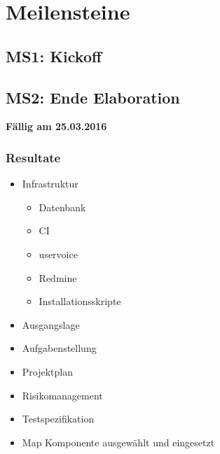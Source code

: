 \section{Meilensteine}
\subsection{MS1: Kickoff}

\subsection{MS2: Ende Elaboration}
\label{pm-ms2}
\textbf{Fällig am 25.03.2016}
\subsubsection{Resultate}
\begin{itemize}
	\item Infrastruktur
	\begin{itemize}
		\item Datenbank
		\item CI
		\item uservoice
		\item Redmine
		\item Installationsskripte
	\end{itemize}
	\item Ausgangslage
	\item Aufgabenstellung
	\item Projektplan
	\item Risikomanagement
	\item Testspezifikation
	\item Map Komponente ausgewählt und eingesetzt
	
\end{itemize}